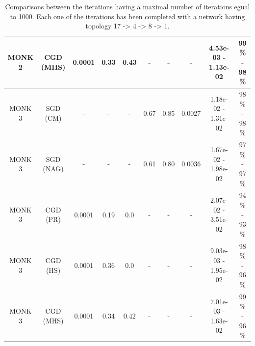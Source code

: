 \begin{table}[H]
\begin{subtable}{\textwidth}
{\begin{tabular}{| c | c | c | c | c | c | c | c | c | c |}
                            \hline
                            MONK 2 &  CGD (MHS) &   0.0001 &     0.33 &  0.43 &     - &      - &       - &  4.53e-03 - 1.13e-02 &  99 \% - 98 \% \\
                            \hline
                            \hline
                            MONK 3 &   SGD (CM) &        - &        - &     - &  0.67 &   0.85 &  0.0027 &  1.18e-02 - 1.31e-02 &  98 \% - 98 \% \\
                            \hline
                            MONK 3 &  SGD (NAG) &        - &        - &     - &  0.61 &   0.80 &  0.0036 &  1.67e-02 - 1.98e-02 &  97 \% - 97 \% \\
                            \hline
                            MONK 3 &   CGD (PR) &   0.0001 &     0.19 &  0.0 &     - &      - &       - &  2.07e-02 - 3.51e-02 &  94 \% - 93 \% \\
                            \hline
                            MONK 3 &   CGD (HS) &   0.0001 &     0.36 &  0.0 &     - &      - &       - &  9.03e-03 - 1.95e-02 &  98 \% - 96 \% \\
                            \hline
                            \rowcolor[gray]{.9}
                            MONK 3 &  CGD (MHS) &   0.0001 &     0.34 &  0.42 &     - &      - &       - &  7.01e-03 - 1.63e-02 &  99 \% - 96 \% \\
                            \hline
                        \end{tabular}
                    }
                \end{subtable}
                \caption{Comparisons between the iterations having a maximal number of iterations egual to 1000.
                Each one of the iterations has been completed with a network having topology
                17 -> 4 -> 8 -> 1.}
                \label{tab:monks_max_iterations}
            \end{table}

